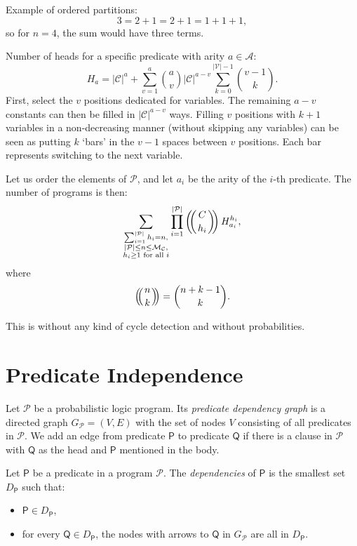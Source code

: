 \documentclass[runningheads]{llncs}
\newcommand{\predicates}{\mathcal{P}}
\newcommand{\variables}{\mathcal{V}}
\newcommand{\constants}{\mathcal{C}}
\newcommand{\arities}{\mathcal{A}}
\newcommand{\maxNumClauses}{\mathcal{M}_{\mathcal{C}}}
\def\multiset#1#2{\ensuremath{\left(\kern-.3em\left(\genfrac{}{}{0pt}{}{#1}{#2}\right)\kern-.3em\right)}}
\begin{document}
Example of ordered partitions:
\[
  3 = 2 + 1 = 2 + 1 = 1 + 1 + 1,
\]
so for $n=4$, the sum would have three terms.

Number of heads for a specific predicate with arity $a \in \arities{}$:
\[
  H_a = |\constants{}|^a + \sum_{v=1}^a \binom{a}{v} |\constants{}|^{a-v}
  \sum_{k=0}^{|\variables{}|-1} \binom{v-1}{k}.
\]
First, select the $v$ positions dedicated for variables. The remaining $a-v$
constants can then be filled in $|\constants{}|^{a-v}$ ways. Filling $v$
positions with $k+1$ variables in a non-decreasing manner (without skipping any
variables) can be seen as putting $k$ `bars' in the $v-1$ spaces between $v$
positions. Each bar represents switching to the next variable.

Let us order the elements of $\predicates{}$, and let $a_i$ be the arity of the
$i$-th predicate. The number of programs is then:
\[
  \sum_{\substack{ \sum_{i=1}^{|\predicates{}|} h_i = n,\\
      |\predicates{}| \le n \le \maxNumClauses,\\
      h_i \ge 1 \text{ for all } i}} \prod_{i=1}^{|\predicates{}|}
  \multiset{C}{h_i} H_{a_i}^{h_i},
\]
where
\[
  \multiset{n}{k} = \binom{n + k - 1}{k}.
\]

This is without any kind of cycle detection and without probabilities.

\section{Predicate Independence}

\begin{definition}
  Let $\mathscr{P}$ be a probabilistic logic program. Its \emph{predicate
    dependency graph} is a directed graph $G_{\mathscr{P}} = (V, E)$ with the
  set of nodes $V$ consisting of all predicates in $\mathscr{P}$. We add an edge
  from predicate $\mathsf{P}$ to predicate $\mathsf{Q}$ if there is a clause in
  $\mathscr{P}$ with $\mathsf{Q}$ as the head and $\mathsf{P}$ mentioned in the
  body.
\end{definition}

\begin{definition}
  Let $\mathsf{P}$ be a predicate in a program $\mathscr{P}$. The
  \emph{dependencies} of $\mathsf{P}$ is the smallest set $D_{\mathsf{P}}$ such
  that:
  \begin{itemize}
  \item $\mathsf{P} \in D_{\mathsf{P}}$,
  \item for every $\mathsf{Q} \in D_{\mathsf{P}}$, the nodes with arrows to
    $\mathsf{Q}$ in $G_{\mathscr{P}}$ are all in $D_{\mathsf{P}}$.
  \end{itemize}
\end{definition}
\end{document}
